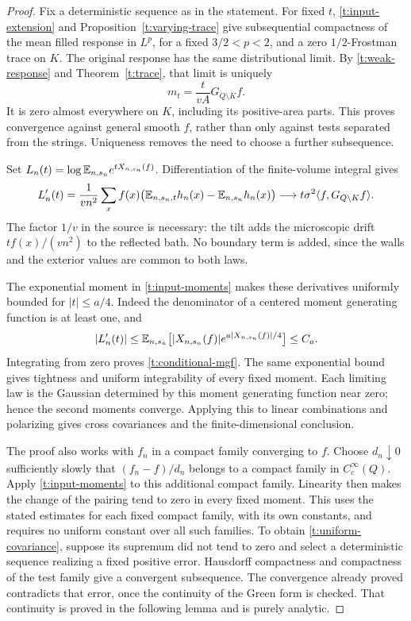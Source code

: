 \begin{proof}
Fix a deterministic sequence as in the statement.  For fixed $t$,
\ref{t:input-extension} and Proposition~\ref{t:varying-trace} give
subsequential compactness of the mean filled response in $L^p$, for a
fixed $3/2<p<2$, and a zero $1/2$-Frostman trace on $K$.  The original
response has the same distributional limit.  By
\eqref{t:weak-response} and Theorem~\ref{t:trace}, that limit is uniquely
\begin{equation}\label{t:response}
 m_t=\frac{t}{vA}G_{Q\setminus K}f.
\end{equation}
It is zero almost everywhere on $K$, including its positive-area parts.
This proves convergence against general smooth $f$, rather than only
against tests separated from the strings.  Uniqueness removes the need
to choose a further subsequence.

Set $L_n(t)=\log\mathbb E_{n,s_n}e^{tX_{n,s_n}(f)}$.  Differentiation of the
finite-volume integral gives
\[
 L_n'(t)
  =\frac1{vn^2}\sum_xf(x)
     \bigl(\mathbb E_{n,s_n,t}h_n(x)-\mathbb E_{n,s_n}h_n(x)\bigr)
  \longrightarrow t\sigma^2\langle f,G_{Q\setminus K}f\rangle.
\]
The factor $1/v$ in the source is necessary: the tilt adds the microscopic
drift $t f(x)/(vn^2)$ to the reflected bath.  No boundary term is added,
since the walls and the exterior values are common to both laws.

The exponential moment in \ref{t:input-moments} makes these derivatives
uniformly bounded for $|t|\le a/4$.  Indeed the denominator of a centered
moment generating function is at least one, and
\[
 |L_n'(t)|\le
 \mathbb E_{n,s_n}\bigl[|X_{n,s_n}(f)|e^{a|X_{n,s_n}(f)|/4}\bigr]\le C_a.
\]
Integrating from zero proves \eqref{t:conditional-mgf}.  The same
exponential bound gives tightness and uniform integrability of every
fixed moment.  Each limiting law is the Gaussian determined by this
moment generating function near zero; hence the second moments converge.
Applying this to linear combinations and polarizing gives cross
covariances and the finite-dimensional conclusion.

The proof also works with $f_n$ in a compact family converging to $f$.
Choose $d_n\downarrow0$ sufficiently slowly that
$(f_n-f)/d_n$ belongs to a compact family in $C_c^\infty(Q)$.  Apply
\ref{t:input-moments} to this additional compact family.  Linearity then
makes the change of the pairing tend to zero in every fixed moment.
This uses the stated estimates for each fixed compact family, with its
own constants, and requires no uniform constant over all such families.
To obtain
\eqref{t:uniform-covariance}, suppose its supremum did not tend to zero
and select a deterministic sequence realizing a fixed positive error.
Hausdorff compactness and compactness of the test family give a convergent
subsequence.  The convergence already proved contradicts that error,
once the continuity of the Green form is checked.  That continuity is
proved in the following lemma and is purely analytic.
\end{proof}

